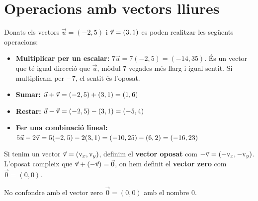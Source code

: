\section{Operacions amb vectors lliures}

\begin{theorybox}
	Donats els vectors $\vec u=(-2, 5)$ i $\vec{\mathrm{v}}=(3,1)$ es poden realitzar les següents operacions:
	
	\begin{itemize}
		\item \textbf{Multiplicar per un escalar:}  $7 \vec u = 7 (-2, 5) = (-14, 35)$. És un vector que té igual direcció que $\vec u$, mòdul 7 vegades més llarg i igual sentit. Si multiplicam per $-7$, el sentit és l'oposat.
		
		\item \textbf{Sumar:} $\vec u + \vec{\mathrm{v}}=(-2, 5)  + (3,1) = (1, 6)$
		
		\item \textbf{Restar:} $\vec u - \vec{\mathrm{v}}=(-2, 5)  - (3,1) = (-5, 4)$
		
		\item \textbf{Fer una combinació lineal:} $5 \vec u - 2\vec{\mathrm{v}} =5(-2, 5)  - 2(3,1) = (-10, 25)-(6,2)=(-16, 23)$
	\end{itemize}

	Si tenim un vector $\vec{\mathrm{v}}=(\mathrm{v}_x,\mathrm{v}_y)$, definim el \textbf{vector oposat} com $-\vec{\mathrm{v}}=(-\mathrm{v}_x, -\mathrm{v}_y)$. L'oposat compleix que $\vec{\mathrm{v}}+(-\vec{\mathrm{v}})=\vec 0$,
on hem definit el \textbf{vector zero} com $\vec 0=(0, 0)$.

\end{theorybox}
\begin{warningbox}
 No confondre amb el vector zero  $\vec 0=(0, 0)$ amb el nombre $0$.
	
\end{warningbox}


